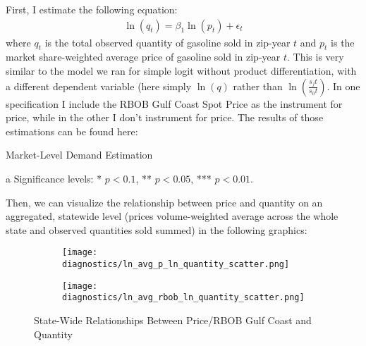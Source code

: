 \documentclass{article}
\begin{document}
First, I estimate the following equation:
\begin{gather}
	\ln(q_t) = \beta_1 \ln(p_t) + \epsilon_t
\end{gather}
where $q_t$ is the total observed quantity of gasoline sold in  zip-year $t$ and $p_t$ is the market share-weighted average price of gasoline sold in zip-year $t$. This is very similar to the model we ran for simple logit without product differentiation, with a different dependent variable (here simply $\ln(q)$ rather than $\ln(\frac{s_jt}{s_0t})$. In one specification I include the RBOB Gulf Coast Spot Price as the instrument for price, while in the other I don't instrument for price. The results of those estimations can be found here:
\begin{table}[H]
\centering
\caption{Market-Level Demand Estimation}
\begin{threeparttable}
	
	\begin{tablenotes}
		\centering
		\item[a] Significance levels: * $p < 0.1$, ** $p < 0.05$, *** $p < 0.01$.
	\end{tablenotes}
\end{threeparttable}
\end{table}

Then, we can visualize the relationship between price and quantity on an aggregated, statewide level (prices volume-weighted average across the whole state and observed quantities sold summed) in the following graphics:
\begin{figure}[H]
	\centering
	\begin{subfigure}[t]{0.4\textwidth}
		\texttt{[image: diagnostics/ln\_avg\_p\_ln\_quantity\_scatter.png]}
	\end{subfigure}
	\begin{subfigure}[t]{0.4\textwidth}
		\texttt{[image: diagnostics/ln\_avg\_rbob\_ln\_quantity\_scatter.png]}
	\end{subfigure}
\caption{State-Wide Relationships Between Price/RBOB Gulf Coast and Quantity}
\end{figure}
\end{document}
